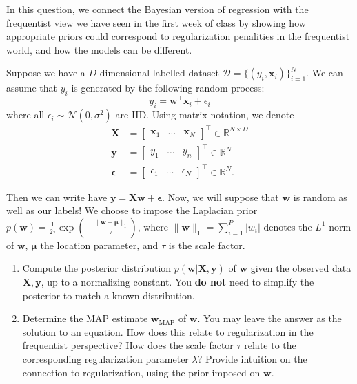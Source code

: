 \documentclass[submit]{harvardml}
\begin{document}
\newpage

\begin{problem}
    In this question, we connect the Bayesian version of regression with the frequentist view we have seen in the first week of class by showing how appropriate priors could correspond to regularization penalities in the frequentist world, and how the models can be different.
    
    Suppose we have a $D$-dimensional labelled dataset $\mathcal{D} = \{(y_i, \mathbf{x}_i)\}_{i=1}^N$. We can assume that $y_i$ is generated by the following random process: $$y_i = \mathbf{w}^\top\mathbf{x}_i + \epsilon_i$$ where all $\epsilon_i \sim \mathcal{N}(0,\sigma^2)$ are IID. Using matrix notation, we denote
    \begin{align*}
      \mathbf{X} &= \begin{bmatrix}\mathbf{x}_1 & \ldots & \mathbf{x}_N\end{bmatrix}^\top \in \mathbb{R}^{N \times D} \\
      \mathbf{y} &= \begin{bmatrix} y_1 & \dots & y_n \end{bmatrix}^\top  \in \mathbb{R}^N \\
      \mathbf{\epsilon} &= \begin{bmatrix} \epsilon_1 & \dots & \epsilon_N \end{bmatrix}^\top \in \mathbb{R}^N.
    \end{align*}
    
    Then we can write have $\mathbf{y} = \mathbf{X}\mathbf{w} + \mathbf{\epsilon}$. Now, we will suppose that $\mathbf{w}$ is random as well as our labels! We choose to impose the Laplacian prior $p(\mathbf{w})=\frac{1}{2\tau}\exp\left(-\frac{\|\mathbf{w}-\mathbf{\mu}\|_1}{\tau}\right)$, where $\|\mathbf{w}\|_1=\sum_{i=1}^P |w_i|$ denotes the $L^1$ norm of $\mathbf{w}$, $\mathbf{\mu}$ the location parameter, and $\tau$ is the scale factor.
    
    \begin{enumerate}
    
        \item Compute the posterior distribution $p(\mathbf{w}|\mathbf{X}, \mathbf{y})$ of $\mathbf{w}$ given the observed data $\mathbf{X}, \mathbf{y}$, up to a normalizing constant. You \textbf{do not} need to simplify the posterior to match a known distribution.
        
        \item Determine the MAP estimate $\mathbf{w}_{\mathrm{MAP}}$ of $\mathbf{w}$. You may leave the answer as the solution to an equation. How does this relate to regularization in the frequentist perspective? How does the scale factor $\tau$ relate to the corresponding regularization parameter $\lambda$? Provide intuition on the connection to regularization, using the prior imposed on $\mathbf{w}$.
        

\end{enumerate}
\end{problem}
\end{document}
